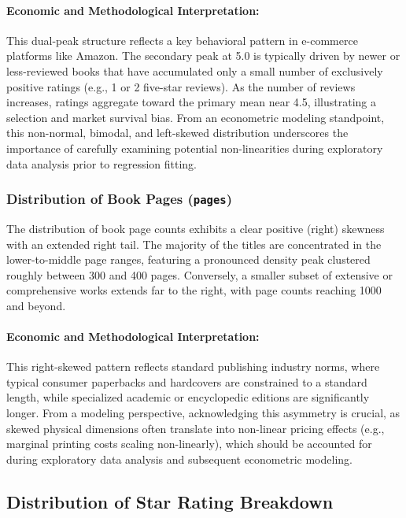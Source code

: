 \documentclass[11pt,a4paper]{article}
\begin{document}
\paragraph{Economic and Methodological Interpretation:}
This dual-peak structure reflects a key behavioral pattern in e-commerce platforms like Amazon. The secondary peak at 5.0 is typically driven by newer or less-reviewed books that have accumulated only a small number of exclusively positive ratings (e.g., 1 or 2 five-star reviews). As the number of reviews increases, ratings aggregate toward the primary mean near 4.5, illustrating a selection and market survival bias. From an econometric modeling standpoint, this non-normal, bimodal, and left-skewed distribution underscores the importance of carefully examining potential non-linearities during exploratory data analysis prior to regression fitting.

\subsubsection*{Distribution of Book Pages (\texttt{pages})}
The distribution of book page counts exhibits a clear positive (right) skewness with an extended right tail. The majority of the titles are concentrated in the lower-to-middle page ranges, featuring a pronounced density peak clustered roughly between 300 and 400 pages. Conversely, a smaller subset of extensive or comprehensive works extends far to the right, with page counts reaching 1000 and beyond.

\paragraph{Economic and Methodological Interpretation:}
This right-skewed pattern reflects standard publishing industry norms, where typical consumer paperbacks and hardcovers are constrained to a standard length, while specialized academic or encyclopedic editions are significantly longer. From a modeling perspective, acknowledging this asymmetry is crucial, as skewed physical dimensions often translate into non-linear pricing effects (e.g., marginal printing costs scaling non-linearly), which should be accounted for during exploratory data analysis and subsequent econometric modeling.

\subsection{Distribution of Star Rating Breakdown}
\end{document}
